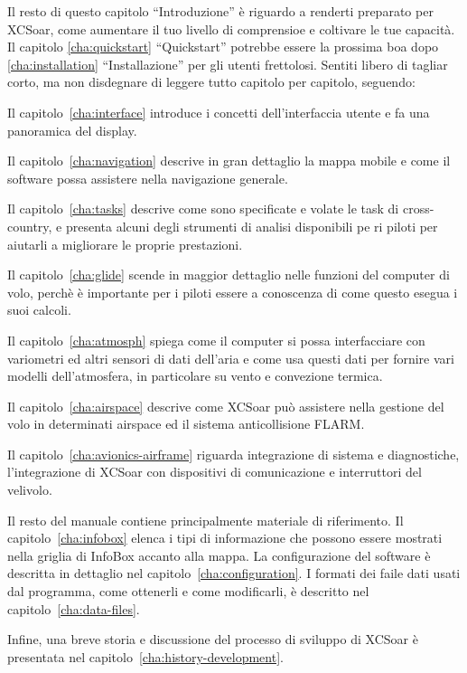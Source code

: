 Il resto di questo capitolo ``Introduzione'' è riguardo a renderti preparato
per XCSoar, come aumentare il tuo livello di comprensioe e coltivare  le tue capacità. 
Il capitolo \ref{cha:quickstart} ``Quickstart'' potrebbe essere la prossima boa dopo
\ref{cha:installation} ``Installazione'' per gli utenti frettolosi. Sentiti libero di 
tagliar corto, ma non disdegnare di leggere tutto capitolo per capitolo, seguendo:

Il capitolo~\ref{cha:interface} introduce i concetti dell'interfaccia utente
e fa una panoramica del display.

Il capitolo~\ref{cha:navigation} descrive in gran dettaglio la mappa mobile
e come il software possa assistere nella navigazione generale.

Il capitolo~\ref{cha:tasks} descrive come sono specificate e volate le task
di cross-country, e presenta alcuni degli strumenti di analisi disponibili
pe ri piloti per aiutarli a migliorare le proprie prestazioni.

Il capitolo~\ref{cha:glide} scende in maggior dettaglio nelle funzioni del computer
di volo, perchè è importante per i piloti essere a conoscenza di come questo 
esegua i suoi calcoli.

Il capitolo~\ref{cha:atmosph} spiega come il computer si possa
interfacciare con variometri ed altri sensori di dati dell'aria
e come usa questi dati per fornire vari modelli dell'atmosfera, in
particolare su vento e convezione termica.

Il capitolo~\ref{cha:airspace} descrive come XCSoar può assistere 
nella gestione del volo in determinati airspace ed il sistema
anticollisione FLARM.

Il capitolo~\ref{cha:avionics-airframe} riguarda integrazione
 di sistema e diagnostiche, l'integrazione di XCSoar con
dispositivi di comunicazione e interruttori del velivolo.

Il resto del manuale contiene principalmente materiale di riferimento.
Il capitolo~\ref{cha:infobox} elenca i tipi di informazione che possono
essere mostrati nella griglia di InfoBox accanto alla mappa.
La configurazione del software è descritta in dettaglio nel capitolo~\ref{cha:configuration}.
I formati dei faile dati usati dal programma, come ottenerli
e come modificarli, è descritto nel capitolo~\ref{cha:data-files}.

Infine, una breve storia e discussione del processo di sviluppo di XCSoar
è presentata nel capitolo~\ref{cha:history-development}.

